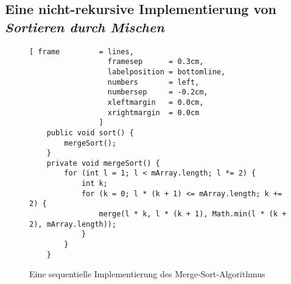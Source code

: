 \subsection{Eine nicht-rekursive Implementierung von \emph{Sortieren durch Mischen}}

\begin{figure}[!ht]
  \centering
\begin{Verbatim}[ frame         = lines, 
                  framesep      = 0.3cm, 
                  labelposition = bottomline,
                  numbers       = left,
                  numbersep     = -0.2cm,
                  xleftmargin   = 0.0cm,
                  xrightmargin  = 0.0cm
                ]
    public void sort() {
        mergeSort();
    }
    private void mergeSort() {
        for (int l = 1; l < mArray.length; l *= 2) {
            int k;
            for (k = 0; l * (k + 1) <= mArray.length; k += 2) {
                merge(l * k, l * (k + 1), Math.min(l * (k + 2), mArray.length));
            }
        }
    }
\end{Verbatim}
\vspace*{-0.3cm}
  \caption{Eine sequentielle Implementierung des Merge-Sort-Algorithmus}
  \label{fig:MergeSortNRAlgorithm.java}
\end{figure}

